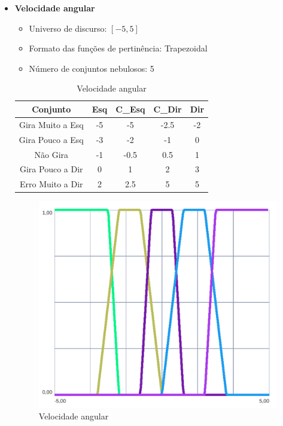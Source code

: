 \begin{itemize}
            \newpage
            
        \item{\bf{Velocidade angular}}
            \begin{itemize}
                \item Universo de discurso: $[-5,5]$
                \item Formato das funções de pertinência: Trapezoidal
                \item Número de conjuntos nebulosos: 5
            \end{itemize}

            \begin{table}[H]
                \centering
                \begin{tabular}{|c|c|c|c|c|}
                    \hline
                    Conjunto               & Esq   & C\_Esq & C\_Dir & Dir   \\ \hline
                    Gira Muito a Esq       & -5    & -5     & -2.5   & -2    \\
                    Gira Pouco a Esq       & -3    & -2     & -1     & 0     \\
                    Não Gira               & -1    & -0.5   & 0.5    & 1     \\
                    Gira Pouco a Dir       & 0     & 1      & 2      & 3     \\
                    Erro Muito a Dir       & 2     & 2.5    & 5      & 5     \\ \hline
                \end{tabular}
                \caption{Velocidade angular}
            \end{table}

            \begin{figure}[H] 
                \centering
                \includegraphics[scale=0.7]{imagens/out_velocidadeang.png}
                \caption{Velocidade angular}
            \end{figure}


\end{itemize}
